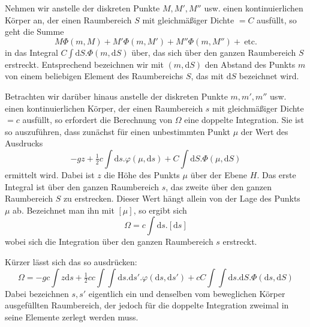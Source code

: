 Nehmen wir anstelle der diskreten Punkte $M,M',M''$ usw. einen kontinuierlichen Körper an, der einen Raumbereich $S$ mit gleichmäßiger Dichte $=C$ ausfüllt, so geht die Summe
\[
M\Phi(m,M)+M'\Phi(m,M')+M''\Phi(m,M'')+\ \text{etc.}
\]
in das Integral $C\int\mathrm{d}S.\Phi(m,\mathrm{d}S)$ über, das sich über den ganzen Raumbereich $S$ erstreckt. Entsprechend bezeichnen wir mit $(m,\mathrm{d}S)$ den Abstand des Punkts $m$ von einem beliebigen Element des Raumbereichs $S$, das mit $\mathrm{d}S$ bezeichnet wird.

Betrachten wir darüber hinaus anstelle der diskreten Punkte $m,m',m''$ usw. einen kontinuierlichen Körper, der einen Raumbereich $s$ mit gleichmäßiger Dichte $=c$ ausfüllt, so erfordert die Berechnung von $\Omega$ eine doppelte Integration. Sie ist so auszuführen, dass zunächst für einen unbestimmten Punkt $\mu$ der Wert des Ausdrucks
\[
-gz+\tfrac12c\int\mathrm{d}s.\varphi(\mu,\mathrm{d}s)+C\int\mathrm{d}S.\Phi(\mu,\mathrm{d}S)
\]
ermittelt wird. Dabei ist $z$ die Höhe des Punkts $\mu$ über der Ebene $H$. Das erste Integral ist über den ganzen Raumbereich $s$, das zweite über den ganzen Raumbereich $S$ zu erstrecken. Dieser Wert hängt allein von der Lage des Punkts $\mu$ ab. Bezeichnet man ihn mit $[\mu]$, so ergibt sich
\[
\Omega=c\int\mathrm{d}s.[\mathrm{d}s]
\]
wobei sich die Integration über den ganzen Raumbereich $s$ erstreckt.

Kürzer lässt sich das so ausdrücken:
\[
\Omega=-gc\int z\mathrm{d}s+\tfrac12cc\int\int\mathrm{d}s.\mathrm{d}s'.\varphi(\mathrm{d}s,\mathrm{d}s')+cC\int\int\mathrm{d}s.\mathrm{d}S.\Phi(\mathrm{d}s,\mathrm{d}S)
\]
Dabei bezeichnen $s,s'$ eigentlich ein und denselben vom beweglichen Körper ausgefüllten Raumbereich, der jedoch für die doppelte Integration zweimal in seine Elemente zerlegt werden muss.

